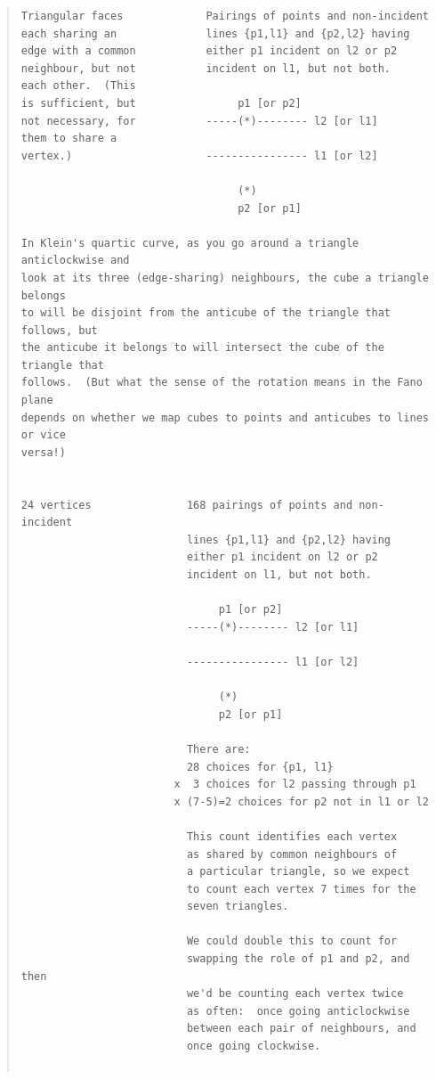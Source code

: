 \documentclass{article}
\begin{document}
\begin{quote}
\begin{verbatim}
Triangular faces             Pairings of points and non-incident
each sharing an              lines {p1,l1} and {p2,l2} having
edge with a common           either p1 incident on l2 or p2
neighbour, but not           incident on l1, but not both.
each other.  (This
is sufficient, but                p1 [or p2]
not necessary, for           -----(*)-------- l2 [or l1]
them to share a
vertex.)                     ---------------- l1 [or l2]

                                  (*)
                                  p2 [or p1]

In Klein's quartic curve, as you go around a triangle anticlockwise and 
look at its three (edge-sharing) neighbours, the cube a triangle belongs 
to will be disjoint from the anticube of the triangle that follows, but 
the anticube it belongs to will intersect the cube of the triangle that 
follows.  (But what the sense of the rotation means in the Fano plane 
depends on whether we map cubes to points and anticubes to lines or vice 
versa!) 


24 vertices               168 pairings of points and non-incident
                          lines {p1,l1} and {p2,l2} having
                          either p1 incident on l2 or p2
                          incident on l1, but not both.

                               p1 [or p2]
                          -----(*)-------- l2 [or l1]

                          ---------------- l1 [or l2]

                               (*)
                               p2 [or p1]

                          There are:
                          28 choices for {p1, l1}
                        x  3 choices for l2 passing through p1
                        x (7-5)=2 choices for p2 not in l1 or l2

                          This count identifies each vertex
                          as shared by common neighbours of
                          a particular triangle, so we expect
                          to count each vertex 7 times for the
                          seven triangles.

                          We could double this to count for
                          swapping the role of p1 and p2, and then
                          we'd be counting each vertex twice
                          as often:  once going anticlockwise
                          between each pair of neighbours, and
                          once going clockwise.


\end{verbatim}
\end{quote}
\end{document}

